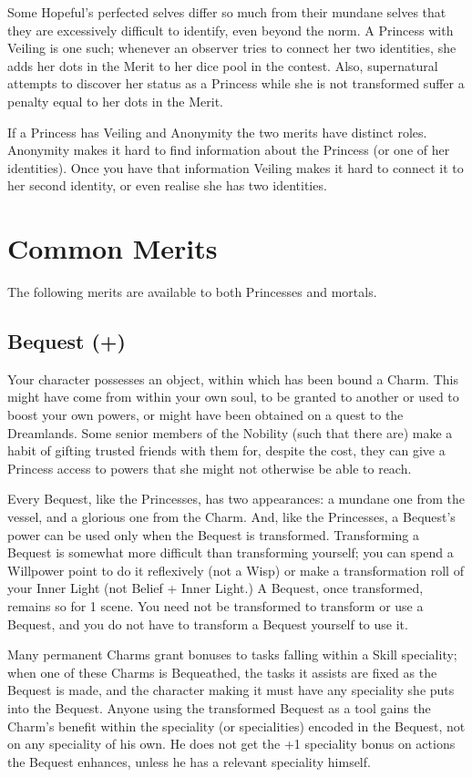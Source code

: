 Some Hopeful's perfected selves differ so much from their mundane selves that they are excessively difficult to identify, even beyond the norm. A Princess with Veiling is one such; whenever an observer tries to connect her two identities, she adds her dots in the Merit to her dice pool in the contest. Also, supernatural attempts to discover her status as a Princess while she is not transformed suffer a penalty equal to her dots in the Merit.

If a Princess has Veiling and Anonymity the two merits have distinct roles. Anonymity makes it hard to find information about the Princess (or one of her identities). Once you have that information Veiling makes it hard to connect it to her second identity, or even realise she has two identities. 


\section*{Common Merits}
The following merits are available to both Princesses and mortals. 

\subsection*{Bequest (\textbullet +)}

Your character possesses an object, within which has been bound a Charm. This might have come from within your own soul, to be granted to another or used to boost your own powers, or might have been obtained on a quest to the Dreamlands. Some senior members of the Nobility (such that there are) make a habit of gifting trusted friends with them for, despite the cost, they can give a Princess access to powers that she might not otherwise be able to reach.

Every Bequest, like the Princesses, has two appearances: a mundane one from the vessel, and a glorious one from the Charm. And, like the Princesses, a Bequest's power can be used only when the Bequest is transformed. Transforming a Bequest is somewhat more difficult than transforming yourself; you can spend a Willpower point to do it reflexively (not a Wisp) or make a transformation roll of your Inner Light (not Belief + Inner Light.) A Bequest, once transformed, remains so for 1 scene. You need not be transformed to transform or use a Bequest, and you do not have to transform a Bequest yourself to use it.

Many permanent Charms grant bonuses to tasks falling within a Skill speciality; when one of these Charms is Bequeathed, the tasks it assists are fixed as the Bequest is made, and the character making it must have any speciality she puts into the Bequest. Anyone using the transformed Bequest as a tool gains the Charm's benefit within the speciality (or specialities) encoded in the Bequest, not on any speciality of his own. He does not get the +1 speciality bonus on actions the Bequest enhances, unless he has a relevant speciality himself.


